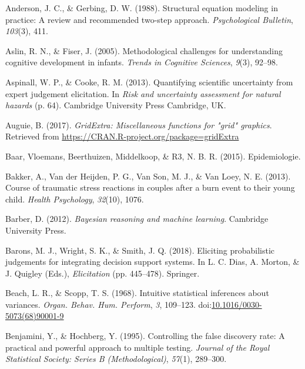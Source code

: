 \documentclass[openright,titlepage,12pt,a4paper]{book}
\begin{document}
\leavevmode\hypertarget{ref-anderson_structural_1988}{}%
Anderson, J. C., \& Gerbing, D. W. (1988). Structural equation modeling in practice: A review and recommended two-step approach. \emph{Psychological Bulletin}, \emph{103}(3), 411.

\leavevmode\hypertarget{ref-aslin_methodological_2005}{}%
Aslin, R. N., \& Fiser, J. (2005). Methodological challenges for understanding cognitive development in infants. \emph{Trends in Cognitive Sciences}, \emph{9}(3), 92--98.

\leavevmode\hypertarget{ref-aspinall_quantifying_2013}{}%
Aspinall, W. P., \& Cooke, R. M. (2013). Quantifying scientific uncertainty from expert judgement elicitation. In \emph{Risk and uncertainty assessment for natural hazards} (p. 64). Cambridge University Press Cambridge, UK.

\leavevmode\hypertarget{ref-R-gridExtra}{}%
Auguie, B. (2017). \emph{GridExtra: Miscellaneous functions for "grid" graphics}. Retrieved from \url{https://CRAN.R-project.org/package=gridExtra}

\leavevmode\hypertarget{ref-van_baar_epidemiologie_2015}{}%
Baar, Vloemans, Beerthuizen, Middelkoop, \& R3, N. B. R. (2015). Epidemiologie.

\leavevmode\hypertarget{ref-bakker_course_2013}{}%
Bakker, A., Van der Heijden, P. G., Van Son, M. J., \& Van Loey, N. E. (2013). Course of traumatic stress reactions in couples after a burn event to their young child. \emph{Health Psychology}, \emph{32}(10), 1076.

\leavevmode\hypertarget{ref-barber_bayesian_2012}{}%
Barber, D. (2012). \emph{Bayesian reasoning and machine learning}. Cambridge University Press.

\leavevmode\hypertarget{ref-barons_eliciting_2018}{}%
Barons, M. J., Wright, S. K., \& Smith, J. Q. (2018). Eliciting probabilistic judgements for integrating decision support systems. In L. C. Dias, A. Morton, \& J. Quigley (Eds.), \emph{Elicitation} (pp. 445--478). Springer.

\leavevmode\hypertarget{ref-beach_intuitive_1968}{}%
Beach, L. R., \& Scopp, T. S. (1968). Intuitive statistical inferences about variances. \emph{Organ. Behav. Hum. Perform}, \emph{3}, 109--123. doi:\href{https://doi.org/10.1016/0030-5073(68)90001-9}{10.1016/0030-5073(68)90001-9}

\leavevmode\hypertarget{ref-benjamini_controlling_1995}{}%
Benjamini, Y., \& Hochberg, Y. (1995). Controlling the false discovery rate: A practical and powerful approach to multiple testing. \emph{Journal of the Royal Statistical Society: Series B (Methodological)}, \emph{57}(1), 289--300.
\end{document}
